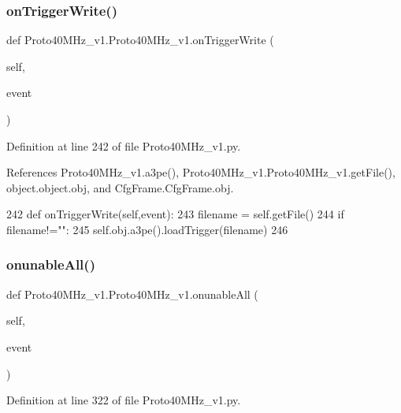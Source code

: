 \subsubsection{\texorpdfstring{on\+Trigger\+Write()}{onTriggerWrite()}}
{\footnotesize\ttfamily def Proto40\+M\+Hz\+\_\+v1.\+Proto40\+M\+Hz\+\_\+v1.\+on\+Trigger\+Write (\begin{DoxyParamCaption}\item[{}]{self,  }\item[{}]{event }\end{DoxyParamCaption})}



Definition at line 242 of file Proto40\+M\+Hz\+\_\+v1.\+py.



References Proto40\+M\+Hz\+\_\+v1.\+a3pe(), Proto40\+M\+Hz\+\_\+v1.\+Proto40\+M\+Hz\+\_\+v1.\+get\+File(), object.\+object.\+obj, and Cfg\+Frame.\+Cfg\+Frame.\+obj.


\begin{DoxyCode}
242     \textcolor{keyword}{def }onTriggerWrite(self,event):
243         filename = self.getFile()
244         \textcolor{keywordflow}{if} filename!=\textcolor{stringliteral}{""}:
245             self.obj.a3pe().loadTrigger(filename)
246 
\end{DoxyCode}
\mbox{\label{classProto40MHz__v1_1_1Proto40MHz__v1_ad140223c54f34dfd64730ccb0140cd81}} 
\subsubsection{\texorpdfstring{onunable\+All()}{onunableAll()}}
{\footnotesize\ttfamily def Proto40\+M\+Hz\+\_\+v1.\+Proto40\+M\+Hz\+\_\+v1.\+onunable\+All (\begin{DoxyParamCaption}\item[{}]{self,  }\item[{}]{event }\end{DoxyParamCaption})}



Definition at line 322 of file Proto40\+M\+Hz\+\_\+v1.\+py.



